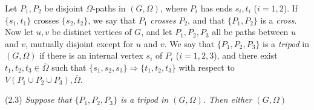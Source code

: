 Let $P_1, P_2$ be disjoint $\Omega$-paths in $(G, \Omega)$, where $P_i$ has ends $s_i, t_i$ ($i = 1, 2$). If $\{s_1, t_1\}$ crosses $\{s_2, t_2\}$, we say that $P_1$ \textit{crosses} $P_2$, and that $\{P_1, P_2\}$ is a \textit{cross}. Now let $u, v$ be distinct vertices of $G$, and let $P_1, P_2, P_3$ all be paths between $u$ and $v$, mutually disjoint except for $u$ and $v$. We say that $\{P_1, P_2, P_3\}$ is a \textit{tripod} in $(G, \Omega)$ if there is an internal vertex $s_i$ of $P_i$ ($i = 1, 2, 3$), and there exist $t_1, t_2, t_3 \in \bar{\Omega}$ such that $\{s_1, s_2, s_3\} \Rightarrow \{t_1, t_2, t_3\}$ with respect to $V(P_1 \cup P_2 \cup P_3), \bar{\Omega}$.

\stmt
(2.3) \textit{Suppose that $\{P_1, P_2, P_3\}$ is a tripod in $(G, \Omega)$. Then either $(G, \Omega)$}
